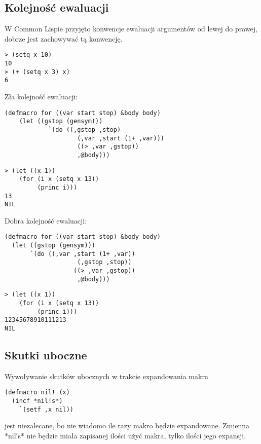 \subsection{Kolejność ewaluacji} %
\label{sub:Kolejność ewaluacji}

\begin{frame}[fragile]{}
W Common Lispie przyjęto konwencje ewaluacji argumentów od lewej do prawej, dobrze jest zachowywać tą konwencję.
\begin{verbatim}
> (setq x 10)
10
> (+ (setq x 3) x)
6
\end{verbatim}
\end{frame}

\begin{frame}[fragile]{}
Zła kolejność ewaluacji:
\begin{verbatim}
(defmacro for ((var start stop) &body body)
	(let ((gstop (gensym)))
       		`(do ((,gstop ,stop)
                 	(,var ,start (1+ ,var)))
                   	((> ,var ,gstop))
		        	,@body)))
\end{verbatim}
\pause
\begin{verbatim}
> (let ((x 1))
    (for (i x (setq x 13))
         (princ i)))
13
NIL
\end{verbatim}
\end{frame}

\begin{frame}[fragile]{}
Dobra kolejność ewaluacji:
\begin{verbatim}
(defmacro for ((var start stop) &body body)
  (let ((gstop (gensym)))
       `(do ((,var ,start (1+ ,var))
                    (,gstop ,stop))
                   ((> ,var ,gstop))
		            ,@body)))
\end{verbatim}
\pause
\begin{verbatim}
> (let ((x 1))
    (for (i x (setq x 13))
         (princ i)))
12345678910111213
NIL
\end{verbatim}
\end{frame}

\subsection{Skutki uboczne} %
\label{sub:Skutki uboczne}
\begin{frame}[fragile]{}
Wywoływanie skutków ubocznych w trakcie expandowania makra
\begin{verbatim}
(defmacro nil! (x)
  (incf *nil!s*)
    `(setf ,x nil))
\end{verbatim}
\pause
jest niezalecane, bo nie wiadomo ile razy makro będzie expandowane. Zmienna *nil!s* nie będzie miała zapisanej ilości użyć makra, tylko ilości jego expansji.
\end{frame}

